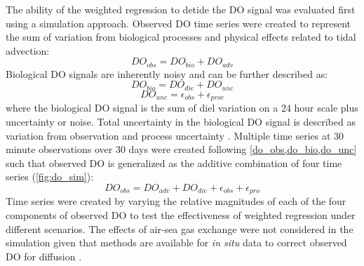 \documentclass[letterpaper,12pt,oneside]{article}\usepackage[]{graphicx}\usepackage[]{color}
\begin{document}
The ability of the weighted regression to detide the \ac{DO} signal was evaluated first using a simulation approach.  Observed \ac{DO} time series were created to represent the sum of variation from biological processes and physical effects related to tidal advection:  
\begin{equation} \label{do_obs}
DO_{obs} = DO_{bio} + DO_{adv}
\end{equation}
Biological \ac{DO} signals are inherently noisy \citep{Batt12} and can be further described as:
\begin{equation} \label{do_bio} 
DO_{bio} = DO_{die} + DO_{unc}
\end{equation} 
\begin{equation} \label{do_unc}
DO_{unc} = \epsilon_{obs} + \epsilon_{proc}
\end{equation}
where the biological \ac{DO} signal is the sum of diel variation on a 24 hour scale plus uncertainty or noise.  Total uncertainty in the biological \ac{DO} signal is described as variation from observation and process uncertainty \citep{Hilborn97}.  Multiple time series at 30 minute observations over 30 days were created following \cref{do_obs,do_bio,do_unc} such that observed \ac{DO} is generalized as the additive combination of four time series (\cref{fig:do_sim}):
\begin{equation} \label{do_obs_all}
DO_{obs} = DO_{adv} + DO_{die} + \epsilon_{obs} + \epsilon_{pro}
\end{equation}
Time series were created by varying the relative magnitudes of each of the four components of observed \ac{DO} to test the effectiveness of weighted regression under different scenarios.  The effects of air-sea gas exchange were not considered in the simulation given that methods are available for \textit{in situ} data to correct observed \ac{DO} for diffusion \citep[i.e., ][]{Thebault08}.  
\end{document}

